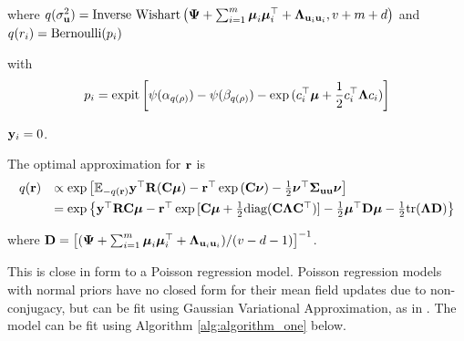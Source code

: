 \documentclass{article}[12pt]
\begin{document}
where 
$q(\sigma_{{\bf u}}^2) = \mbox{Inverse Wishart}\left({\boldsymbol \Psi} + \sum_{i=1}^m {\boldsymbol \mu}_i {\boldsymbol \mu}_i^\top + {\boldsymbol \Lambda}_{{\bf u}_i {\bf u}_i}, v + m + d\right)$ \mbox{and } $q(r_i) = \text{Bernoulli} (p_i)$

with
$$
p_i = \text{expit} \left[ \psi{(\alpha_{q(\rho)})} - \psi{(\beta_{q(\rho)})} - \exp{(c_i^\top{\boldsymbol\mu}+ {\frac{1}{2}}c_i^\top {\boldsymbol\Lambda}c_i)} \right]
$$

 ${\bf y}_i = 0$.



The optimal approximation for ${\bf r}$ is
$$
\begin{array}{rl}
q({\bf r}) &\propto \exp \left [ {\mathbb E}_{-q({\bf r})}{\bf y}^\top{\bf R}({\bf C}{\boldsymbol \mu}) - {\bf r}^\top\exp{({\bf C}{\boldsymbol\nu})}-{\frac{1}{2}} {\boldsymbol \nu}^\top {\boldsymbol\Sigma}_{{\bf u} {\bf u}} {\boldsymbol \nu} \right ] \\ [1ex]
	&= \exp{ \left\{ {\bf y}^\top{\bf R}{\bf C}{\boldsymbol\mu}- {\bf r}^\top \exp{[{\bf C}{\boldsymbol\mu}+ {\frac{1}{2}}\text{diag}({\bf C}{\boldsymbol\Lambda}{\bf C}^\top)]} - {\frac{1}{2}}{\boldsymbol\mu}^\top {\bf D}{\boldsymbol\mu}- {\frac{1}{2}}\text{tr}({\boldsymbol\Lambda}{\bf D}) \right\} }
\end{array}
$$

where ${\bf D} =  \left[ ({\boldsymbol \Psi} + \sum_{i=1}^m {\boldsymbol \mu}_i {\boldsymbol \mu}_i^\top + {\boldsymbol \Lambda}_{{\bf u}_i{\bf u}_i}) / (v - d - 1) \right]^{-1}$. 

This is close in form to a Poisson regression model. Poisson regression models
with normal priors have no closed form for their mean field updates due to
non-conjugacy, but can be fit using Gaussian Variational Approximation, as in
\citep{ormerod09}. The model can be fit using Algorithm \ref{alg:algorithm_one} below.
\end{document}
